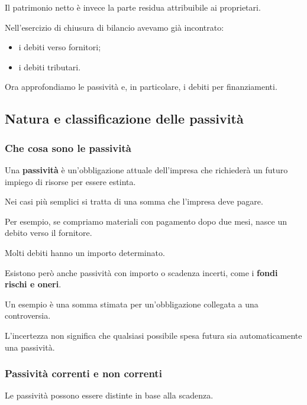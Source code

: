 \noindent Il patrimonio netto
è invece la parte residua
attribuibile ai proprietari.

\medskip

\noindent Nell'esercizio di chiusura di bilancio
avevamo già incontrato:

\begin{itemize}
    \item i debiti verso fornitori;
    \item i debiti tributari.
\end{itemize}

\noindent Ora approfondiamo
le passività e, in particolare,
i debiti per finanziamenti.


\subsection{Natura e classificazione delle passività}

\subsubsection*{Che cosa sono le passività}

\noindent Una \textbf{passività}
è un'obbligazione attuale dell'impresa
che richiederà un futuro impiego
di risorse per essere estinta.

\noindent Nei casi più semplici
si tratta di una somma
che l'impresa deve pagare.

\noindent Per esempio,
se compriamo materiali
con pagamento dopo due mesi,
nasce un debito verso il fornitore.

\medskip

\noindent Molti debiti hanno
un importo determinato.

\noindent Esistono però anche passività
con importo o scadenza incerti,
come i \textbf{fondi rischi e oneri}.

\noindent Un esempio è una somma stimata
per un'obbligazione collegata
a una controversia.

\noindent L'incertezza non significa
che qualsiasi possibile spesa futura
sia automaticamente una passività.


\subsubsection*{Passività correnti e non correnti}

\noindent Le passività possono essere
distinte in base alla scadenza.

